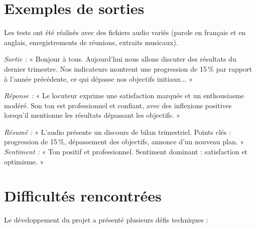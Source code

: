\documentclass[12pt,a4paper]{report}
\begin{document}
\section{Exemples de sorties}

Les tests ont été réalisés avec des fichiers audio variés (parole en français et en
anglais, enregistrements de réunions, extraits musicaux).

\begin{infobox}
\textit{Sortie :} « Bonjour à tous. Aujourd'hui nous allons discuter des résultats du
dernier trimestre. Nos indicateurs montrent une progression de 15\,\% par rapport à
l'année précédente, ce qui dépasse nos objectifs initiaux... »
\end{infobox}

\begin{infobox}
\textit{Réponse :} « Le locuteur exprime une satisfaction marquée et un enthousiasme
modéré. Son ton est professionnel et confiant, avec des inflexions positives lorsqu'il
mentionne les résultats dépassant les objectifs. »
\end{infobox}

\begin{infobox}
\textit{Résumé :} « L'audio présente un discours de bilan trimestriel. Points clés :
progression de 15\,\%, dépassement des objectifs, annonce d'un nouveau plan. »\\[0.3em]
\textit{Sentiment :} « Ton positif et professionnel. Sentiment dominant : satisfaction et
optimisme. »
\end{infobox}

\section{Difficultés rencontrées}

Le développement du projet a présenté plusieurs défis techniques :
\end{document}
